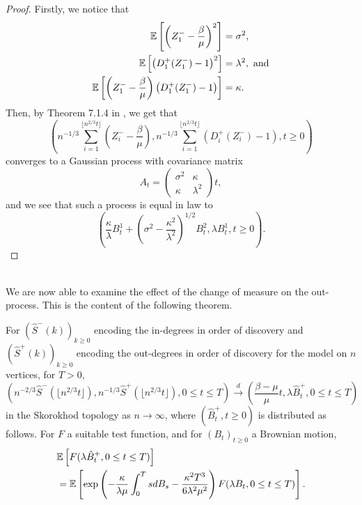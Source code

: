 \begin{proof}
 Firstly, we notice that 
 \begin{align*}
     {\mathbb E}\left[\left(Z^-_1-\frac{\beta}{\mu}\right)^2\right]&=\sigma^2,\\
      {\mathbb E}\left[\left(D^+_1(Z^-_1)-1\right)^2\right]&=\lambda^2,\text{ and}\\
     {\mathbb E}\left[\left(Z^-_1-\frac{\beta}{\mu}\right)\left(D^+_1(Z^-_1)-1\right)\right]&=\kappa.\\
 \end{align*}
 Then, by Theorem 7.1.4 in \cite{Ethier1986}, we get that 
 $$\left(n^{-1/3}\sum\limits_{i=1}^{\lfloor  n^{2/3}t\rfloor} \left(Z^-_i-\frac{\beta}{\mu}\right),n^{-1/3}\sum\limits_{i=1}^{\lfloor  n^{2/3}t\rfloor} \left(D^+_i(Z^-_i)-1\right), t\geq 0\right)$$
 converges to a Gaussian process with covariance matrix
 $$A_t=\begin{pmatrix} \sigma^2  & \kappa \\ \kappa  & \lambda^2  \end{pmatrix}t,$$
 and we see that such a process is equal in law to
 $$\left(\frac{\kappa}{\lambda}B_t^1+\left(\sigma^2-\frac{\kappa^2}{\lambda^2}\right)^{1/2}B_t^2   ,\lambda B_t^1 ,t\geq 0\right).$$
 \end{proof}\\
 We are now able to examine the effect of the change of measure on the out-process. This is the content of the following theorem. 
\begin{theorem}\label{theorem.convaftermeasurechange} 
 For $\left(\hat{S}^-(k)\right)_{k\geq 0}$ encoding the in-degrees in order of discovery and   $\left(\hat{S}^+(k)\right)_{k\geq 0}$ encoding the out-degrees in order of discovery for the model on $n$ vertices, for $T>0$,
$$\left(n^{-2/3}\hat{S}^-\left(\lfloor n^{2/3} t\rfloor\right), n^{-1/3}\hat{S}^+\left(\lfloor  n^{2/3} t\rfloor\right), 0\leq t \leq T \right) \overset{d}{\to} \left( \frac{\beta-\mu}{\mu}t, \lambda\hat{B}_t^+, 0 \leq t \leq T \right)$$
in the Skorokhod topology as $n\to \infty$, where $(\hat{B}^+_t, t\geq 0)$ is distributed as follows.
For $F$ a suitable test function, and for $(B_t)_{t\geq 0}$ a Brownian motion,
\begin{align*} &{\mathbb E}\left[F(\lambda \hat{B}^+_t,0\leq t \leq T)\right]\\&={\mathbb E}\left[\exp\left(-\frac{\kappa}{\lambda \mu} \int_0^T s dB_s -\frac{\kappa^2 T^3}{6\lambda^2 \mu^2}\right)F(\lambda B_t,   0\leq t \leq T)\right].\end{align*}

\end{theorem}
